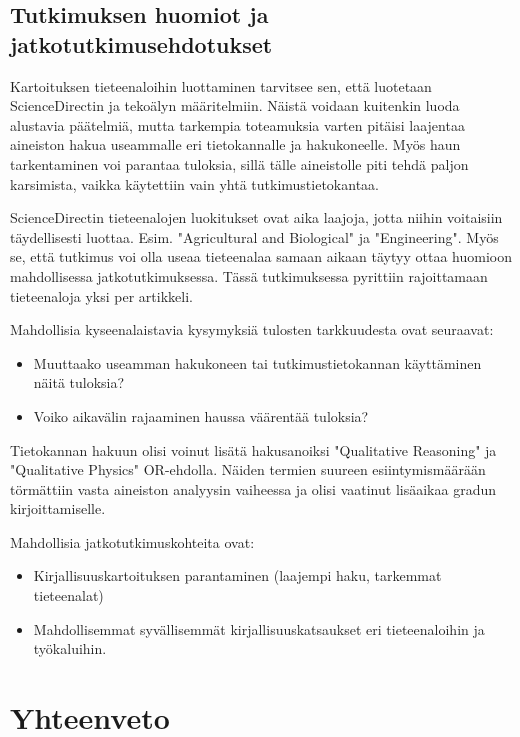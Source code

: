 \documentclass[utf8]{gradu3}
\begin{document}
\section{Tutkimuksen huomiot ja jatkotutkimusehdotukset}
Kartoituksen tieteenaloihin luottaminen tarvitsee sen, 
että luotetaan ScienceDirectin  ja tekoälyn määritelmiin. 
Näistä voidaan kuitenkin luoda alustavia päätelmiä, mutta tarkempia
toteamuksia varten pitäisi laajentaa aineiston hakua useammalle eri tietokannalle ja hakukoneelle. Myös haun tarkentaminen voi parantaa tuloksia, sillä tälle 
aineistolle piti tehdä paljon karsimista, 
vaikka käytettiin vain yhtä tutkimustietokantaa.

ScienceDirectin tieteenalojen luokitukset ovat aika laajoja, jotta niihin voitaisiin täydellisesti luottaa. Esim. "Agricultural and Biological" ja "Engineering". Myös se, että tutkimus voi olla useaa tieteenalaa samaan aikaan täytyy ottaa huomioon mahdollisessa jatkotutkimuksessa. 
Tässä tutkimuksessa pyrittiin rajoittamaan tieteenaloja yksi per artikkeli.

Mahdollisia kyseenalaistavia kysymyksiä tulosten tarkkuudesta ovat seuraavat:
\begin{itemize}
    \item Muuttaako useamman hakukoneen tai tutkimustietokannan käyttäminen näitä tuloksia? 
    \item Voiko aikavälin rajaaminen haussa väärentää tuloksia?
\end{itemize}

Tietokannan hakuun olisi voinut lisätä hakusanoiksi 
"Qualitative Reasoning" ja "Qualitative Physics" OR-ehdolla. 
Näiden termien suureen esiintymismäärään törmättiin vasta aineiston 
analyysin vaiheessa ja olisi vaatinut lisäaikaa gradun kirjoittamiselle.

Mahdollisia jatkotutkimuskohteita ovat: 
\begin{itemize}
    \item Kirjallisuuskartoituksen parantaminen  (laajempi haku, tarkemmat tieteenalat)
    \item Mahdollisemmat syvällisemmät kirjallisuuskatsaukset eri tieteenaloihin ja työkaluihin.
\end{itemize}

\chapter{Yhteenveto}


\printbibliography

\appendix
\end{document}

